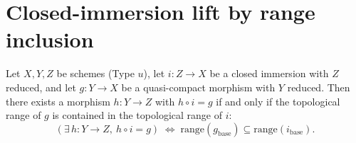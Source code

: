 \section{Closed-immersion lift by range inclusion}
\label{sec:lift_iff_range_subset}

\begin{theorem}
  \label{thm:IsClosedImmersion_lift_iff_range_subset}
  Let \(X,Y,Z\) be schemes (Type \(u\)), let \(i : Z \to X\) be a closed
  immersion with \(Z\) reduced, and let \(g : Y \to X\) be a
  quasi-compact morphism with \(Y\) reduced. Then there exists a
  morphism \(h : Y \to Z\) with \(h \circ i = g\) if and only if the
  topological range of \(g\) is contained in the topological range of
  \(i\):
  \[
    (\exists\, h : Y \to Z,\ h \circ i = g)
    \;\iff\;
    \mathrm{range}(g_{\text{base}}) \subseteq \mathrm{range}(i_{\text{base}}).
  \]
\end{theorem}
